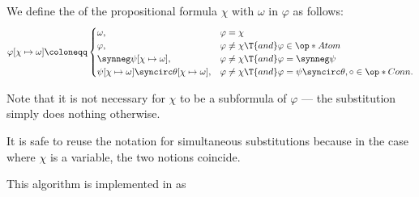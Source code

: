 \begin{algorithm}\label{alg:propositional_subformula_substitution}
  We define the  of the propositional formula \( \chi \) with \( \omega \) in \( \varphi \) as follows:
  \begin{equation}\label{eq:alg:propositional_subformula_substitution}
    \varphi[\chi \mapsto \omega] \coloneqq \begin{cases}
      \omega,                                                         &\varphi = \chi \\
      \varphi,                                                        &\varphi \neq \chi \T{and} \varphi \in \op*{Atom} \\
      \synneg \psi[\chi \mapsto \omega],                              &\varphi \neq \chi \T{and} \varphi = \synneg \psi \\
      \psi[\chi \mapsto \omega] \syncirc \theta[\chi \mapsto \omega], &\varphi \neq \chi \T{and} \varphi = \psi \syncirc \theta, \circ \in \op*{Conn}.
    \end{cases}
  \end{equation}
\end{algorithm}
\begin{comments}
  \item Note that it is not necessary for \( \chi \) to be a subformula of \( \varphi \) --- the substitution simply does nothing otherwise.
  \item It is safe to reuse the notation for simultaneous substitutions because in the case where \( \chi \) is a variable, the two notions coincide.
  \item This algorithm is implemented in \cite{notebook:code} as
  \begin{CodeRefDisplay}
  \end{CodeRefDisplay}
\end{comments}

